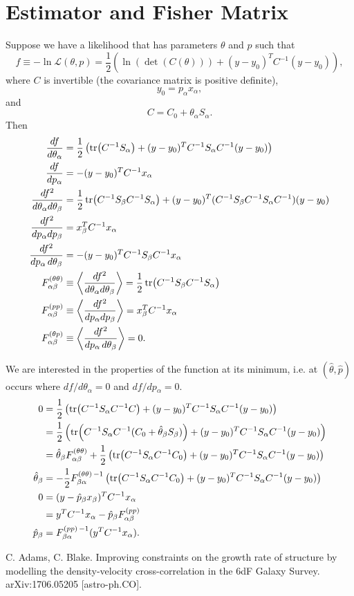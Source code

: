 \documentclass{article}
\begin{document}
\appendix
\section{Estimator and Fisher Matrix}
Suppose we have a likelihood that has parameters $\theta$ and $p$ such that
$$f\equiv-\ln{\mathcal{L}(\theta,p)} = \frac{1}{2}\left(\ln{(\det(C(\theta)))} + (y-y_0 )^T C^{-1} (y-y_0)\right),$$
where $C$ is invertible (the covariance matrix is positive definite),
$$y_0 = p_\alpha x_\alpha,$$ and
 $$C=C_0 + \theta_\alpha S_\alpha.$$
Then
\begin{align}
\frac{df}{d\theta_\alpha} &= \frac{1}{2}\left(\tr(C^{-1}S_\alpha)   + (y-y_0)^T  C^{-1} S_{\alpha} C^{-1}  (y-y_0)\right)\\ 
\frac{df}{dp_{\alpha}} &= -(y-y_0)^T C^{-1} x_\alpha\\ 
\frac{df^2}{d\theta_{\alpha} d\theta_\beta} &= \frac{1}{2}  \tr (C^{-1} S_\beta C^{-1}  S_\alpha) +  (y-y_0)^T (
C^{-1} S_{\beta } C^{-1} S_\alpha C^{-1}
)
(y-y_0) \\ 
\frac{df^2}{dp_{\alpha} dp_\beta} &= x^T_\beta C^{-1} x_\alpha\\ 
\frac{df^2}{dp_\alpha \,d\theta_\beta} &=-  (y-y_0)^T C^{-1}  S _\beta C^{-1} x_\alpha\\
F_{\alpha \beta}^{(\theta \theta)} & \equiv \left \langle  \frac{df^2}{d\theta_{\alpha} d\theta_\beta} \right \rangle = \frac{1}{2} \tr (C^{-1} S_\beta C^{-1}  S_\alpha) \\ 
F_{\alpha \beta}^{(p p)}  & \equiv \left \langle  \frac{df^2}{dp_{\alpha} dp_\beta} \right \rangle= x^T_\beta C^{-1} x_\alpha\\ 
F_{\alpha \beta}^{(\theta p)}  & \equiv \left \langle  \frac{df^2}{dp_\alpha \,d\theta_\beta} \right \rangle =0.
\end{align}

We are interested in the properties of the function at its minimum, i.e. at $(\hat{\theta},\hat{p})$ occurs where $df/d\theta_\alpha=0 $ and $df/dp{_\alpha}=0$.
\begin{align}
0 & = \frac{1}{2}\left(\tr(C^{-1}S_\alpha C^{-1} C)  + (y-y_0)^T  C^{-1} S_{\alpha} C^{-1}  (y-y_0)\right) \\
& = \frac{1}{2}\left(\tr(C^{-1}S_\alpha C^{-1} (C_0 + \hat{\theta}_\beta S_\beta) )  + (y-y_0)^T  C^{-1} S_{\alpha} C^{-1}  (y-y_0)\right) \\
& =\hat{ \theta}_\beta F^{(\theta \theta)}_{\alpha \beta} +  \frac{1}{2}\left(\tr(C^{-1}S_\alpha C^{-1} C_0)  + (y-y_0)^T  C^{-1} S_{\alpha} C^{-1}  (y-y_0)\right) \\
\hat{ \theta}_\beta  & = - \frac{1}{2} F^{(\theta \theta)\, -1}_{\beta \alpha} \left(\tr(C^{-1}S_\alpha C^{-1} C_0)  + (y-y_0)^T  C^{-1} S_{\alpha} C^{-1}  (y-y_0)\right) \\
0 &=  (y-\hat{p}_\beta x_\beta )^T C^{-1} x_\alpha \\
& = y^TC^{-1} x_\alpha - \hat{p}_\beta F^{(pp)}_{\alpha \beta} \\
 \hat{p}_\beta  & =   F^{(pp)\,-1}_{\beta \alpha} (y^TC^{-1} x_\alpha ).
\end{align}


\begin{thebibliography}{9}
C. Adams, C. Blake. 
Improving constraints on the growth rate of structure by modelling the density-velocity cross-correlation in the 6dF Galaxy Survey. arXiv:1706.05205 [astro-ph.CO].
\end{thebibliography}
\end{document}
